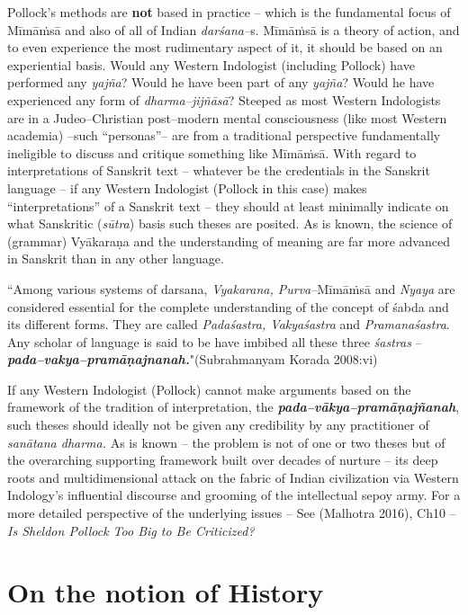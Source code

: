 Pollock’s methods are \textbf{not} based in practice – which is the fundamental focus of Mīmāṁsā and also of all of Indian \textit{darśana–}s. Mīmāṁsā is a theory of action, and to even experience the most rudimentary aspect of it, it should be based on an experiential basis. Would any Western Indologist (including Pollock) have performed any \textit{yajña}? Would he have been part of any \textit{yajña}? Would he have experienced any form of \textit{dharma–jijñāsā}? Steeped as most Western Indologists are in a Judeo–Christian post–modern mental consciousness (like most Western academia) –such “personas”– are from a traditional perspective fundamentally ineligible to discuss and critique something like Mīmāṁsā. With regard to interpretations of Sanskrit text – whatever be the credentials in the Sanskrit language – if any Western Indologist (Pollock in this case) makes “interpretations” of a Sanskrit text – they should at least minimally indicate on what Sanskritic (\textit{sūtra}) basis such theses are posited. As is known, the science of (grammar) Vyākaraṇa and the understanding of meaning are far more advanced in Sanskrit than in any other language.

\begin{myquote}
“Among various systems of darsana, \textit{Vyakarana, Purva–}Mīmāṁsā and \textit{Nyaya} are considered essential for the complete understanding of the concept of śabda and its different forms. They are called \textit{Padaśastra, Vakyaśastra} and \textit{Pramanaśastra}. Any scholar of language is said to be have imbibed all these three \textit{śastras} – \textit{\textbf{pada–vakya–pramāṇajnanah.}}"\hfill (Subrahmanyam Korada 2008:vi)
\end{myquote}

If any Western Indologist (Pollock) cannot make arguments based on the framework of the tradition of interpretation, the \textit{\textbf{pada–vākya–pramāṇajñanah}}, such theses should ideally not be given any credibility by any practitioner of \textit{sanātana dharma.} As is known – the problem is not of one or two theses but of the overarching supporting framework built over decades of nurture – its deep roots and multidimensional attack on the fabric of Indian civilization via Western Indology’s influential discourse and grooming of the intellectual sepoy army. For a more detailed perspective of the underlying issues – See (Malhotra 2016), Ch10 – \textit{Is Sheldon Pollock Too Big to Be Criticized?}


\section*{On the notion of History}


